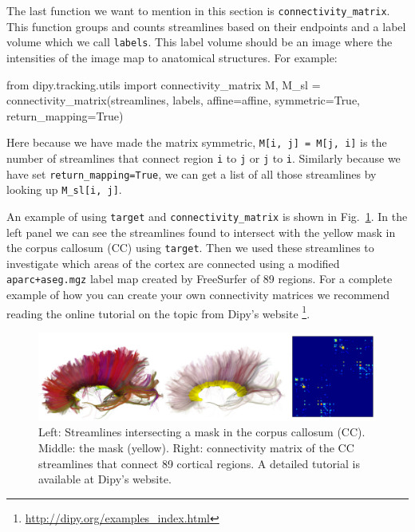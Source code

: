\documentclass{bioinfo}
\begin{document}
The last function we want to mention in this section is
\texttt{connectivity\_matrix}. This function groups and counts streamlines
based on their endpoints and a label volume which we call \texttt{labels}. This
label volume should be an image where the intensities of the image map to
anatomical structures. For example:

\begin{python}
from dipy.tracking.utils import
                              connectivity_matrix
M, M_sl = connectivity_matrix(streamlines, labels,
                              affine=affine,
                              symmetric=True,
                              return_mapping=True)
\end{python}

Here because we have made the matrix symmetric, \texttt{M[i, j] = M[j, i]} is the number of streamlines that connect region \texttt{i} to \texttt{j}
or \texttt{j} to \texttt{i}. Similarly because we have set
\texttt{return\_mapping=True}, we can get a list of all those streamlines by
looking up \texttt{M\_sl[i, j]}.

An example of using \texttt{target} and \texttt{connectivity\_matrix} is shown in Fig.~\ref{Fig:connectivity}. In the left panel we can see the streamlines found to intersect with the yellow mask in the corpus callosum (CC) using \texttt{target}. Then we used these streamlines to investigate which areas of
the cortex are connected using a modified  \texttt{aparc+aseg.mgz} label map created by FreeSurfer \citep{fischl-freesurfer:12} of 89 regions. For a complete example of how you can create your own connectivity matrices we recommend reading the online tutorial on the topic from Dipy's website \footnote{\url{http://dipy.org/examples\_index.html}}.

\begin{figure}[!htb]
\includegraphics[scale=0.9]{Figures/connectivity_cc.jpg}
\centering{}
\caption{Left: Streamlines intersecting a mask in the corpus callosum (CC).
  Middle: the mask (yellow). Right: connectivity matrix of the CC streamlines that connect 89 cortical regions. A detailed tutorial is available at Dipy's website. \label{Fig:connectivity}}
\end{figure}
\end{document}
